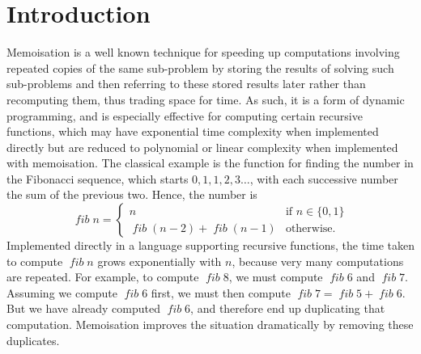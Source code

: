 
\section{Introduction}

Memoisation \citep{Michie1968,Norvig1991} is a well known technique for speeding up
computations involving repeated copies of the same sub-problem by
storing the results of solving such sub-problems and then referring to these
stored results later rather than recomputing them, thus trading
space for time. As such, it is a form of dynamic programming, and is
especially effective for computing certain recursive functions, which may have
exponential time complexity when implemented directly but are reduced to
polynomial or linear complexity when implemented with memoisation. The classical
example is the function for finding the  number in the Fibonacci 
sequence, which starts $0, 1, 1, 2, 3 \ldots$, with each successive number the
sum of the previous two. Hence, the  number is
\def\fib#1{\operatorname{\textit{fib}} #1}
\begin{equation}
	\fib n = \begin{cases}
											n & \text{if $n\in\{0,1\}$} \\
											\fib (n-2) + \fib (n-1) & \text{otherwise.}
										\end{cases}
\end{equation}
Implemented directly in a language supporting recursive functions, the time taken
to compute $\fib n$ grows exponentially with $n$, because very many computations
are repeated.
For example,
to compute $\fib 8$, we must compute $\fib 6$ and $\fib 7$. Assuming we compute
$\fib 6$ first, we must then compute $\fib 7 = \fib 5 + \fib 6$. But we have
already computed $\fib 6$, and therefore end up duplicating that computation.
Memoisation improves the situation dramatically by removing these duplicates.

